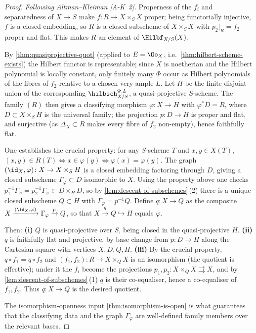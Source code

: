 \begin{proof}
  \emph{Following Altman--Kleiman [A-K~2].} Properness of the $f_i$ and
  separatedness of $X\to S$ make $f\colon R\to X\times_S X$ proper; being
  functorially injective, $f$ is a closed embedding, so $R$ is a closed subscheme
  of $X\times_S X$ with $p_2|_R = f_2$ proper and flat. This makes $R$ an element
  of $\Hilbf_{X/S}(X)$.

  By \cref{thm:quasiprojective-quot} (applied to $E = \Oo_X$, i.e.\
  \cref{thm:hilbert-scheme-exists}) the Hilbert functor is representable; since
  $X$ is noetherian and the Hilbert polynomial is locally constant, only finitely
  many $\Phi$ occur as Hilbert polynomials of the fibres of $f_2$ relative to a
  chosen very ample $L$. Let $H$ be the finite disjoint union of the corresponding
  $\hilbsch_{X/S}^{\Phi,L}$, a quasi-projective $S$-scheme. The family $(R)$ then
  gives a classifying morphism $\varphi\colon X\to H$ with $\varphi^*D = R$, where
  $D\subset X\times_S H$ is the universal family; the projection $p\colon D\to H$
  is proper and flat, and surjective (as $\Delta_X\subset R$ makes every fibre of
  $f_2$ non-empty), hence faithfully flat.

  One establishes the crucial property: for any $S$-scheme $T$ and
  $x,y\in X(T)$, $(x,y)\in R(T) \iff x\in\varphi(y) \iff \varphi(x)=\varphi(y)$.
  The graph $(\id_X,\varphi)\colon X\to X\times_S H$ is a closed embedding
  factoring through $D$, giving a closed subscheme
  $\Gamma_\varphi\subset D$ isomorphic to $X$. Using the property above one checks
  $p_1^{-1}\Gamma_\varphi = p_2^{-1}\Gamma_\varphi\subset D\times_H D$, so by
  \cref{lem:descent-of-subschemes}\,(2) there is a unique closed subscheme
  $Q\subset H$ with $\Gamma_\varphi = p^{-1}Q$. Define $q\colon X\to Q$ as the
  composite $X\xrightarrow{(\id_X,\varphi)}\Gamma_\varphi\xrightarrow{p}Q$, so that
  $X\xrightarrow{q}Q\hookrightarrow H$ equals $\varphi$.

  Then: \textbf{(i)} $Q$ is quasi-projective over $S$, being closed in the
  quasi-projective $H$. \textbf{(ii)} $q$ is faithfully flat and projective, by
  base change from $p\colon D\to H$ along the Cartesian square with vertices
  $X,D,Q,H$. \textbf{(iii)} By the crucial property,
  $q\circ f_1 = q\circ f_2$ and $(f_1,f_2)\colon R\to X\times_Q X$ is an
  isomorphism (the quotient is effective); under it the $f_i$ become the
  projections $p_1,p_2\colon X\times_Q X\rightrightarrows X$, and by
  \cref{lem:descent-of-subschemes}\,(1) $q$ is their co-equaliser, hence a
  co-equaliser of $f_1,f_2$. Thus $q\colon X\to Q$ is the desired quotient.

  The isomorphism-openness input \cref{thm:isomorphism-is-open} is what guarantees
  that the classifying data and the graph $\Gamma_\varphi$ are well-defined family
  members over the relevant bases.
\end{proof}


